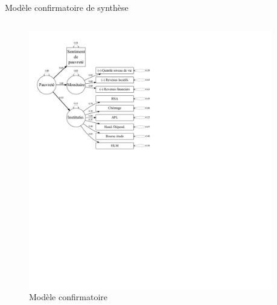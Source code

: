 \documentclass[10pt,xcolor=table,color={dvipsnames,usenames},ignorenonframetext,usepdftitle=false,french]{beamer}
\begin{document}
\begin{frame}{Modèle confirmatoire de synthèse}
\protect\hypertarget{moduxe8le-confirmatoire-de-synthuxe8se}{}
\begin{columns}[T]
\begin{column}{0.6\textwidth}
\begin{figure}[!ht]

{\centering \includegraphics[width=2\linewidth]{M2_ANTUNEZ_SQD_ORAL_files/figure-beamer/grviz4-1} 

}

\caption[Modèle confirmatoire]{Modèle confirmatoire}\label{fig:grviz4}

\footnotesize
\normalsize\end{figure}
\end{column}

\begin{column}{0.4\textwidth}
\footnotesize

\pause


\end{column}
\end{columns}
\end{frame}
\end{document}

